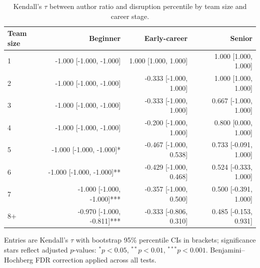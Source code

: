\begin{table}\centering
\caption{Kendall’s $\tau$ between author ratio and disruption percentile by team size and career stage.}
\begin{tabular}{lrrr}
Team size & Beginner & Early-career & Senior \\
\midrule
1 & -1.000 [-1.000, -1.000] & 1.000 [1.000, 1.000] & 1.000 [1.000, 1.000] \\
2 & -1.000 [-1.000, -1.000] & -0.333 [-1.000, 1.000] & 1.000 [1.000, 1.000] \\
3 & -1.000 [-1.000, -1.000] & -0.333 [-1.000, 1.000] & 0.667 [-1.000, 1.000] \\
4 & -1.000 [-1.000, -1.000] & -0.200 [-1.000, 1.000] & 0.800 [0.000, 1.000] \\
5 & -1.000 [-1.000, -1.000]* & -0.467 [-1.000, 0.538] & 0.733 [-0.091, 1.000] \\
6 & -1.000 [-1.000, -1.000]** & -0.429 [-1.000, 0.468] & 0.524 [-0.333, 1.000] \\
7 & -1.000 [-1.000, -1.000]*** & -0.357 [-1.000, 0.500] & 0.500 [-0.391, 1.000] \\
8+ & -0.970 [-1.000, -0.811]*** & -0.333 [-0.806, 0.310] & 0.485 [-0.153, 0.931] \\
\bottomrule
\end{tabular}
\vspace{0.25em}
\footnotesize{Entries are Kendall's $\tau$ with bootstrap 95\% percentile CIs in brackets; significance stars reflect adjusted $p$-values: $^{*}p<0.05$, $^{**}p<0.01$, $^{***}p<0.001$. Benjamini–Hochberg FDR correction applied across all tests.}
\end{table}